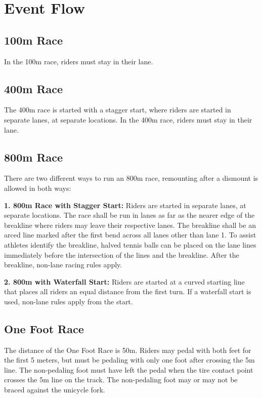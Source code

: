 \section{Event Flow}

\subsection{100m Race}

In the 100m race, riders must stay in their lane.

\subsection{400m Race}

The 400m race is started with a stagger start, where riders are started in separate lanes, at separate locations.
In the 400m race, riders must stay in their lane.

\subsection{800m Race}

There are two different ways to run an 800m race, remounting after a dismount is allowed in both ways:

\textbf{1. 800m Race with Stagger Start:} Riders are started in separate lanes, at separate locations.
The race shall be run in lanes as far as the nearer edge of the breakline where riders may leave their respective lanes.
The breakline shall be an arced line marked after the first bend across all lanes other than lane 1.
To assist athletes identify the breakline, halved tennis balls can be placed on the lane lines immediately before the intersection of the lines and the breakline.
After the breakline, non-lane racing rules apply.

\textbf{2. 800m with Waterfall Start:} Riders are started at a curved starting line that places all riders an equal distance from the first turn.
If a waterfall start is used, non-lane rules apply from the start.

\subsection{One Foot Race}
The distance of the One Foot Race is 50m.
Riders may pedal with both feet for the first 5 meters, but must be pedaling with only one foot after crossing the 5m line.
The non-pedaling foot must have left the pedal when the tire contact point crosses the 5m line on the track.
The non-pedaling foot may or may not be braced against the unicycle fork.

